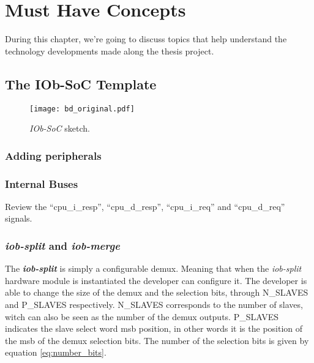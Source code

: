\chapter{Must Have Concepts}
During this chapter, we're going to discuss topics that help understand the technology developments made along the thesis project.

\section{The IOb-SoC Template}
\label{section:the_iob_soc_template}

\begin{figure}[!h]
    \centering
    \texttt{[image: bd\_original.pdf]}
    \caption{\textit{IOb-SoC} sketch.}
    \label{fig:bd_original}
\end{figure}

\subsection{Adding peripherals}
\subsection{Internal Buses}
Review the \enquote{cpu\_i\_resp}, \enquote{cpu\_d\_resp}, \enquote{cpu\_i\_req} and \enquote{cpu\_d\_req} signals.

\subsection{\textit{iob-split} and \textit{iob-merge}}
The \textbf{\textit{iob-split}} is simply a configurable \acrfull{demux}. Meaning that when the \textit{iob-split} hardware module is instantiated the developer can configure it. The developer is able to change the size of the \acrlong{demux} and the selection bits, through N\_SLAVES and P\_SLAVES respectively. N\_SLAVES corresponds to the number of slaves, witch can also be seen as the number of the \acrshort{demux} outputs. P\_SLAVES indicates the slave select word \acrfull{msb} position, in other words it is the position of the \acrshort{msb} of the \acrlong{demux} selection bits. The number of the selection bits is given by equation \ref{eq:number_bits}.

